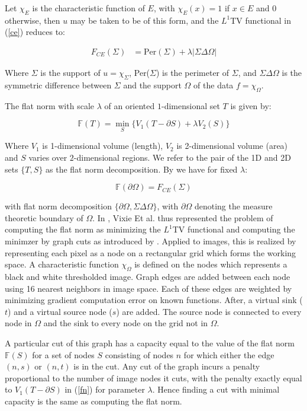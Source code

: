 \documentclass[12pt]{article}
\begin{document}
Let $\chi_E$ is the characteristic function of $E$, with $\chi_E(x) = 1$ if $x \in E$ and $0$ otherwise, then $u$ may be taken to be of this form, and the $L^1$TV functional in (\ref{ce}) reduces to:

\begin{align*}
F_{CE}(\Sigma) &= \text{Per}(\Sigma) + \lambda|\Sigma \Delta \Omega|
\end{align*}

Where $\Sigma$ is the support of $u = \chi_\Sigma$, Per($\Sigma$) is the perimeter of $\Sigma$, and $\Sigma \Delta \Omega$ is the symmetric difference between $\Sigma$ and the support $\Omega$ of the data $f = \chi_\Omega$. 

The flat norm with scale $\lambda$ of an oriented $1$-dimensional set $T$ is given by:

\begin{equation} \label{fn}
\mathbb{F}(T) = \min_S \{V_1(T-\partial S) + \lambda V_2(S)\}
\end{equation}

Where $V_1$ is 1-dimensional volume (length), $V_2$ is 2-dimensional volume (area) and $S$ varies over $2$-dimensional regions. We refer to the pair of the 1D and 2D sets $\{T,S\}$ as the flat norm decomposition. By \cite{Morgan_2007} we have for fixed $\lambda$:

\begin{equation}
\mathbb{F}(\partial \Omega) = F_{CE}(\Sigma)
\end{equation}

with flat norm decomposition $\{\partial \Omega, \Sigma \Delta \Omega\}$, with $\partial \Omega$ denoting the measure theoretic boundary of $\Omega$. In \cite{shapes}, Vixie Et al. thus represented the problem of computing the flat norm as minimizing the $L^1$TV functional and computing the minimzer by graph cuts as introduced by \cite{kolmogorov}. Applied to images, this is realized by representing each pixel as a node on a rectangular grid which forms the working space. A characteristic function $\chi_\Omega$ is defined on the nodes which represents a black and white thresholded image. Graph edges are added between each node using 16 nearest neighbors in image space. Each of these edges are weighted by minimizing gradient computation error on known functions. After, a virtual sink ($t$) and a virtual source node ($s$) are added. The source node is connected to every node in $\Omega$ and the sink to every node on the grid not in $\Omega$. 

A particular cut of this graph has a capacity equal to the value of the flat norm $\mathbb{F}(S)$ for a set of nodes $S$ consisting of nodes $n$ for which either the edge $(n,s)$ or $(n,t)$ is in the cut. Any cut of the graph incurs a penalty proportional to the number of image nodes it cuts, with the penalty exactly equal to $V_1(T-\partial S)$ in (\ref{fn}) for parameter $\lambda$. Hence finding a cut with minimal capacity is the same as computing the flat norm. 
\end{document}
